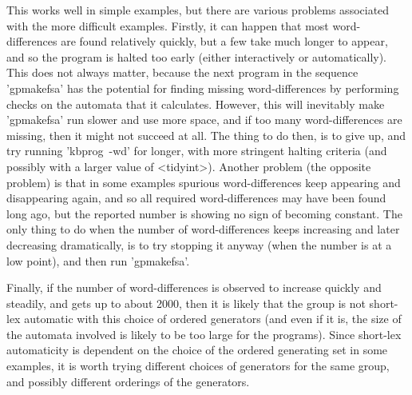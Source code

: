 This works well in simple examples, but there are various problems
associated with the more difficult examples. Firstly, it can happen that
most word-differences are found relatively quickly, but a few take much longer
to appear, and so the program is halted too early (either interactively or
automatically). This does not always matter, because the next program in
the sequence 'gpmakefsa' has the potential for finding missing word-differences
by performing checks on the automata that it calculates. However, this
will inevitably make 'gpmakefsa' run slower and use more space, and if too
many word-differences are missing, then it might not succeed at all. The thing
to do then, is to give up, and try running 'kbprog\ -wd' for longer, with more
stringent halting criteria (and possibly with a larger value of <tidyint>).
Another problem (the opposite problem) is that in some examples spurious
word-differences keep appearing and disappearing again, and so all required
word-differences may have been found long ago, but the reported number is
showing no sign of becoming constant. The only thing to do
when the number of word-differences keeps increasing and later decreasing
dramatically, is to try stopping it anyway (when the number is at
a low point), and then run 'gpmakefsa'.

Finally, if the number of word-differences is observed to increase quickly and
steadily, and gets up to about 2000, then it is likely that the group is not
short-lex automatic with this choice of ordered generators (and even if it is,
the size of the automata involved is likely to be too large for the
programs). Since short-lex automaticity is dependent on the choice of the
ordered generating set in some examples, it is worth trying different
choices of generators for the same group, and possibly different orderings
of the generators.

